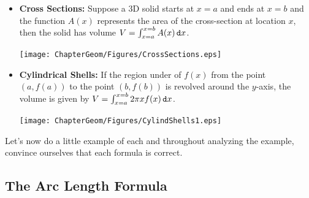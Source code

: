 \begin{enumerate}
\begin{itemize}

\item {\bf Cross Sections:}  Suppose a 3D solid starts at $x=a$ and ends at $x=b$ and the function $A(x)$ represents the area of the cross-section at location $x$, then the solid has volume $V=\int_{x=a}^{x=b}A(x) \mathop{}\!\mathtt{d} x $. 

	\begin{center}
		\texttt{[image: ChapterGeom/Figures/CrossSections.eps]}
	\end{center}
\item {\bf Cylindrical Shells:}  If the region under of $f(x)$ from the point $\left(a,f(a)\right)$ to the point $\left(b,f(b)\right)$ is revolved around the $y$-axis, the volume is given by $ V= \int_{x=a}^{x=b} 2 \pi x f(x) \mathop{}\!\mathtt{d} x $.
    
    \begin{center}
		\texttt{[image: ChapterGeom/Figures/CylindShells1.eps]}
	\end{center}

\end{itemize}
\end{enumerate}

Let's now do a little example of each and throughout analyzing the example, convince ourselves that each formula is correct.

\subsection{The Arc Length Formula}\label{ArcLength}

